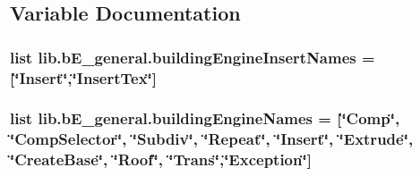 \subsection{Variable Documentation}
\hypertarget{namespacelib_1_1b_e__general_a749122d14f45612af29898d4a1b2340f}{
\subsubsection[{building\-Engine\-Insert\-Names}]{\setlength{\rightskip}{0pt plus 5cm}list lib.\-b\-E\-\_\-general.\-building\-Engine\-Insert\-Names = \mbox{[}\char`\"{}Insert\char`\"{},\char`\"{}Insert\-Tex\char`\"{}\mbox{]}}}\label{namespacelib_1_1b_e__general_a749122d14f45612af29898d4a1b2340f}
\hypertarget{namespacelib_1_1b_e__general_a85d4f42eb223bd1fdefcdb1b85074c9f}{
\subsubsection[{building\-Engine\-Names}]{\setlength{\rightskip}{0pt plus 5cm}list lib.\-b\-E\-\_\-general.\-building\-Engine\-Names = \mbox{[}\char`\"{}Comp\char`\"{}, \char`\"{}Comp\-Selector\char`\"{}, \char`\"{}Subdiv\char`\"{}, \char`\"{}Repeat\char`\"{}, \char`\"{}Insert\char`\"{}, \char`\"{}Extrude\char`\"{}, \char`\"{}Create\-Base\char`\"{}, \char`\"{}Roof\char`\"{}, \char`\"{}Trans\char`\"{},\char`\"{}Exception\char`\"{}\mbox{]}}}\label{namespacelib_1_1b_e__general_a85d4f42eb223bd1fdefcdb1b85074c9f}
